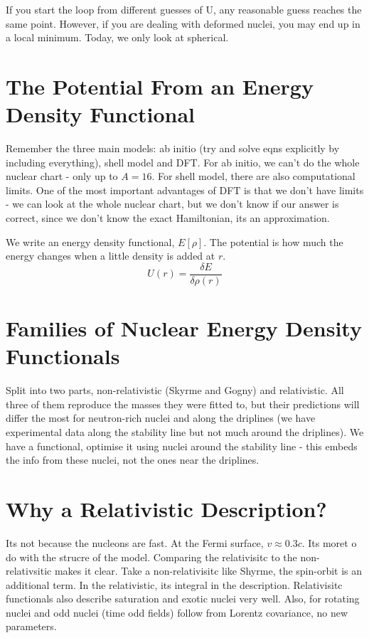 If you start the loop from different guesses of U, any reasonable guess reaches the same point. However, if you are dealing with deformed nuclei, you may end up in a local minimum. Today, we only look at spherical. 

\section{The Potential From an Energy Density Functional}
Remember the three main models: ab initio (try and solve eqns explicitly by including everything), shell model and DFT. For ab initio, we can't do the whole nuclear chart - only up to \(A=16\). For shell model, there are also computational limits. One of the most important advantages of DFT is that we don't have limits - we can look at the whole nuclear chart, but we don't know if our answer is correct, since we don't know the exact Hamiltonian, its an approximation. 

We write an energy density functional, \(E[\rho]\). The potential is how much the energy changes when a little density is added at \(r\).
\[U(r) = \frac{\delta E}{\delta \rho (r)}\]

\section{Families of Nuclear Energy Density Functionals}
Split into two parts, non-relativistic (Skyrme and Gogny) and relativistic. All three of them reproduce the masses they were fitted to, but their predictions will differ the most for neutron-rich nuclei and along the driplines (we have experimental data along the stability line but not much around the driplines). We have a functional, optimise it using nuclei around the stability line - this embeds the info from these nuclei, not the ones near the driplines. 

\section{Why a Relativistic Description?}
Its not because the nucleons are fast. At the Fermi surface, \(v\approx 0.3c\). Its moret o do with the strucre of the model. Comparing the relativisitc to the non-relativsitic makes it clear. Take a non-relativisitc like Shyrme, the spin-orbit is an additional term. In the relativistic, its integral in the description. Relativisitc functionals also describe saturation and exotic nuclei very well. Also, for rotating nuclei and odd nuclei (time odd fields) follow from Lorentz covariance, no new parameters.


